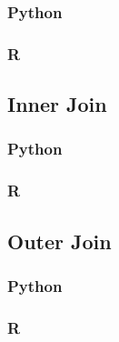 \documentclass[
]{book}
\begin{document}
\hypertarget{python-28}{%
\subsubsection*{Python}\label{python-28}}

\hypertarget{r-28}{%
\subsubsection*{R}\label{r-28}}

\hypertarget{inner-join}{%
\subsection{Inner Join}\label{inner-join}}

\hypertarget{python-29}{%
\subsubsection*{Python}\label{python-29}}

\hypertarget{r-29}{%
\subsubsection*{R}\label{r-29}}

\hypertarget{outer-join}{%
\subsection{Outer Join}\label{outer-join}}

\hypertarget{python-30}{%
\subsubsection*{Python}\label{python-30}}

\hypertarget{r-30}{%
\subsubsection*{R}\label{r-30}}

  
\end{document}

